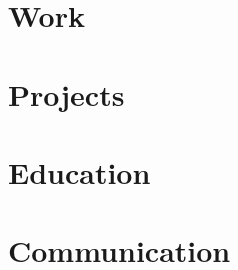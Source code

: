 \documentclass[12pt, a4paper, sans, obeyspaces, unicode]{moderncv}
\begin{document}
\maketitle

\vspace{0.5cm}
\section{Work}

    

\section{Projects}

    

\section{Education}

    

\section{Communication}

    
\end{document}

